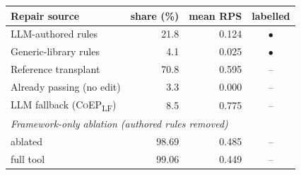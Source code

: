 \begin{tabular}{lrrc}
\toprule
Repair source & share (\%) & mean RPS & labelled \\
\midrule
LLM-authored rules & 21.8 & 0.124 & $\bullet$ \\
Generic-library rules & 4.1 & 0.025 & $\bullet$ \\
Reference transplant & 70.8 & 0.595 & -- \\
Already passing (no edit) & 3.3 & 0.000 & -- \\
\midrule
LLM fallback (\textsc{CoEP}\textsubscript{LF}) & 8.5 & 0.775 & -- \\
\midrule
\multicolumn{4}{l}{\emph{Framework-only ablation (authored rules removed)}}\\
\quad ablated & 98.69 & 0.485 & -- \\
\quad full tool & 99.06 & 0.449 & -- \\
\bottomrule
\end{tabular}
